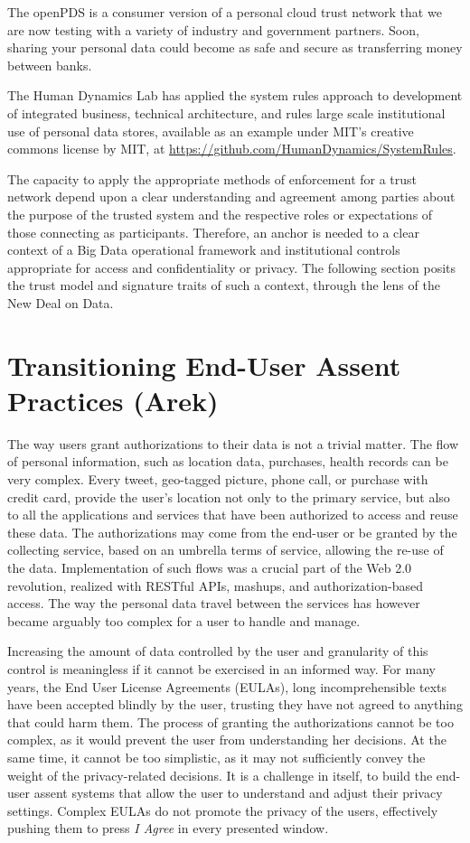 The openPDS is a consumer version of a personal cloud trust network that we are now testing with a variety of industry and government partners.
Soon, sharing your personal data could become as safe and secure as transferring money between banks.

The Human Dynamics Lab has applied the system rules approach to development of integrated business, technical architecture, and rules large scale institutional use of personal data stores, available as an example under MIT's creative commons license by MIT, at \url{https://github.com/HumanDynamics/SystemRules}. 

The capacity to apply the appropriate methods of enforcement for a trust network depend upon a clear understanding and agreement among parties about the purpose of the trusted system and the respective roles or expectations of those connecting as participants.
Therefore, an anchor is needed to a clear context of a Big Data operational framework and institutional controls appropriate for access and confidentiality or privacy.
The following section posits the trust model and signature traits of such a context, through the lens of the New Deal on Data.

\section{Transitioning End-User Assent Practices (Arek)}

The way users grant authorizations to their data is not a trivial matter.
The flow of personal information, such as location data, purchases, health records can be very complex.
Every tweet, geo-tagged picture, phone call, or purchase with credit card, provide the user's location not only to the primary service, but also to all the applications and services that have been authorized to access and reuse these data.
The authorizations may come from the end-user or be granted by the collecting service, based on an umbrella terms of service, allowing the re-use of the data.
Implementation of such flows was a crucial part of the Web 2.0 revolution, realized with RESTful APIs, mashups, and authorization-based access.
The way the personal data travel between the services has however became arguably too complex for a user to handle and manage.

Increasing the amount of data controlled by the user and granularity of this control is meaningless if it cannot be exercised in an informed way.
For many years, the End User License Agreements (EULAs), long incomprehensible texts have been accepted blindly by the user, trusting they have not agreed to anything that could harm them.
The process of granting the authorizations cannot be too complex, as it would prevent the user from understanding her decisions.
At the same time, it cannot be too simplistic, as it may not sufficiently convey the weight of the privacy-related decisions.
It is a challenge in itself, to build the end-user assent systems that allow the user to understand and adjust their privacy settings.
Complex EULAs do not promote the privacy of the users, effectively pushing them to press \emph{I Agree} in every presented window. 

